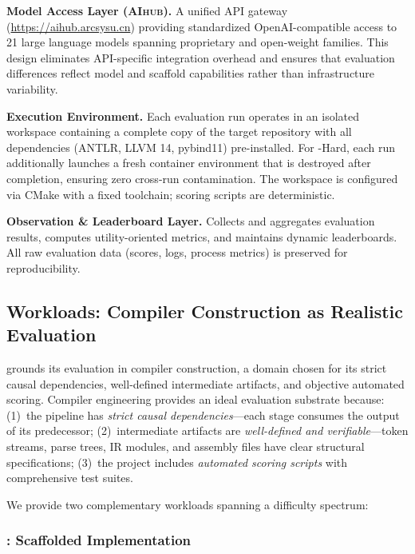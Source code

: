 \textbf{Model Access Layer (\textsc{AIhub}).}
A unified API gateway (\url{https://aihub.arcsysu.cn}) providing standardized OpenAI-compatible access to 21 large language models spanning proprietary and open-weight families.
This design eliminates API-specific integration overhead and ensures that evaluation differences reflect model and scaffold capabilities rather than infrastructure variability.

\textbf{Execution Environment.}
Each evaluation run operates in an isolated workspace containing a complete copy of the target repository with all dependencies (ANTLR, LLVM 14, pybind11) pre-installed.
For \yatcc{}-Hard, each run additionally launches a fresh container environment that is destroyed after completion, ensuring zero cross-run contamination.
The workspace is configured via CMake with a fixed toolchain; scoring scripts are deterministic.

\textbf{Observation \& Leaderboard Layer.}
Collects and aggregates evaluation results, computes utility-oriented metrics, and maintains dynamic leaderboards.
All raw evaluation data (scores, logs, process metrics) is preserved for reproducibility.


\subsection{Workloads: Compiler Construction as Realistic Evaluation}

\eva{} grounds its evaluation in compiler construction, a domain chosen for its strict causal dependencies, well-defined intermediate artifacts, and objective automated scoring.
Compiler engineering provides an ideal evaluation substrate because: (1)~the pipeline has \emph{strict causal dependencies}---each stage consumes the output of its predecessor; (2)~intermediate artifacts are \emph{well-defined and verifiable}---token streams, parse trees, IR modules, and assembly files have clear structural specifications; (3)~the project includes \emph{automated scoring scripts} with comprehensive test suites.

We provide two complementary workloads spanning a difficulty spectrum:

\subsubsection{\yatcc{}: Scaffolded Implementation}

